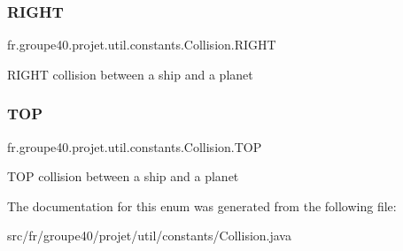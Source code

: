 \subsubsection{\texorpdfstring{R\+I\+G\+HT}{RIGHT}}
{\footnotesize\ttfamily fr.\+groupe40.\+projet.\+util.\+constants.\+Collision.\+R\+I\+G\+HT}

R\+I\+G\+HT collision between a ship and a planet \mbox{\label{enumfr_1_1groupe40_1_1projet_1_1util_1_1constants_1_1_collision_a33f93051e0cba60810a61290f849f5df}} 
\subsubsection{\texorpdfstring{T\+OP}{TOP}}
{\footnotesize\ttfamily fr.\+groupe40.\+projet.\+util.\+constants.\+Collision.\+T\+OP}

T\+OP collision between a ship and a planet 

The documentation for this enum was generated from the following file\+:\begin{DoxyCompactItemize}
\item 
src/fr/groupe40/projet/util/constants/Collision.\+java\end{DoxyCompactItemize}
